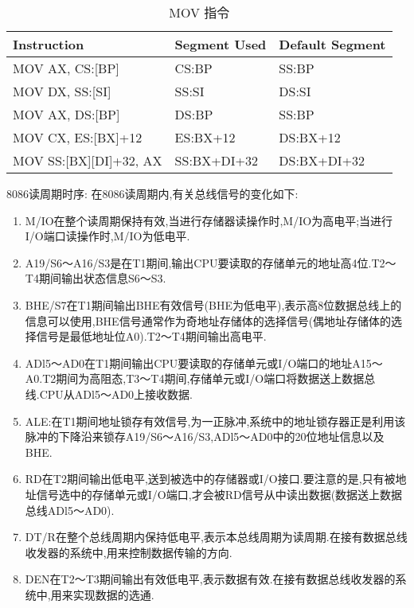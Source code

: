 \begin{table*}
	\centering
	\caption{MOV 指令}
	\begin{tabular}{|>{\ttfamily}l|>{\ttfamily}l|>{\ttfamily}l|}
		\hline
		\bfseries Instruction & \bfseries Segment Used & \bfseries Default Segment \\
		\hline
		MOV AX, CS:[BP] & CS:BP & SS:BP \\
		MOV DX, SS:[SI] & SS:SI	& DS:SI \\
		MOV AX, DS:[BP] & DS:BP & SS:BP \\
		MOV CX, ES:[BX]+12 & ES:BX+12 & DS:BX+12 \\
		MOV SS:[BX][DI]+32, AX & SS:BX+DI+32 & DS:BX+DI+32 \\
		\hline
	\end{tabular}
\end{table*}

8086读周期时序:
在8086读周期内,有关总线信号的变化如下:
\begin{enumerate}
\item M/IO在整个读周期保持有效,当进行存储器读操作时,M/IO为高电平;当进行I/O端口读操作时,M/IO为低电平.
\item A19/S6～A16/S3是在T1期间,输出CPU要读取的存储单元的地址高4位.T2～T4期间输出状态信息S6～S3.
\item BHE/S7在T1期间输出BHE有效信号(BHE为低电平),表示高8位数据总线上的信息可以使用,BHE信号通常作为奇地址存储体的选择信号(偶地址存储体的选择信号是最低地址位A0).T2～T4期间输出高电平.
\item ADl5～AD0在T1期间输出CPU要读取的存储单元或I/O端口的地址A15～A0.T2期间为高阻态,T3～T4期间,存储单元或I/O端口将数据送上数据总线.CPU从ADl5～AD0上接收数据.
\item ALE:在T1期间地址锁存有效信号,为一正脉冲,系统中的地址锁存器正是利用该脉冲的下降沿来锁存A19/S6～A16/S3,ADl5～AD0中的20位地址信息以及BHE.
\item RD在T2期间输出低电平,送到被选中的存储器或I/O接口.要注意的是,只有被地址信号选中的存储单元或I/O端口,才会被RD信号从中读出数据(数据送上数据总线ADl5～AD0).
\item DT/R在整个总线周期内保持低电平,表示本总线周期为读周期.在接有数据总线收发器的系统中,用来控制数据传输的方向.
\item DEN在T2～T3期间输出有效低电平,表示数据有效.在接有数据总线收发器的系统中,用来实现数据的选通.
\end{enumerate}

